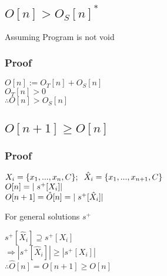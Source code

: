 \documentclass[11pt]{article}
\begin{document}
\subsection{$O[n] > O_S[n]^*$}
Assuming Program is not void
\subsubsection{Proof}
\begin{center}
$
O[n] := O_T[n] + O_S[n]
$
\\ \vspace{3mm}
$
O_T[n] > 0
$
\\ \vspace{3mm}
$
\therefore O[n] > O_S[n]
$
\end{center}


\subsection{$O[n+1] \geq O[n]$}
\subsubsection{Proof}
\begin{center}
$
X_i = \{x_1,...,x_n,C\}; \hspace{2mm} \hat{X}_i = \{x_1,...,x_{n+1},C\}
$
\\ \vspace{4mm}
$
O[n] = |\hspace{1mm} s^+[X_i]|
$
\\ \vspace{2mm}
$
O[n+1] = \hat{O}[n] = |\hspace{1mm} s^+[\hat{X}_i]|
$
\end{center}
\hspace{4mm}
For general solutions $s^+$
\begin{center}
$
s^+[\hat{X}_i] \supseteq s^+[X_i] 
$
\\ \vspace{2mm}
$
\Rightarrow |s^+[\hat{X}_i]| \geq |s^+[X_i]|
$
\\ \vspace{2mm}
$
\therefore \hat{O}[n] = O[n+1] \geq O[n]
$
\end{center}










\end{document}
